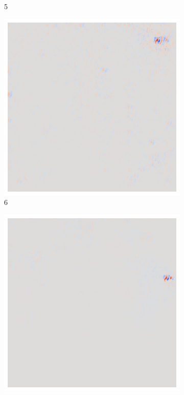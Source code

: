 \begin{figure}[ht!]
\begin{subfigure}{0.095\linewidth}
        \caption{5}
    \end{subfigure}\hfill%
    \begin{subfigure}{0.095\linewidth}
        \centering
        \includegraphics[height=1\linewidth]{01-images/05-resultate/uap_resnet/uap0-resnet18-covid-n200-robustificationslevel6.png}
        \caption{6}
    \end{subfigure}\hfill%
    \begin{subfigure}{0.095\linewidth}
        \centering
        \includegraphics[height=1\linewidth]{01-images/05-resultate/uap_resnet/uap0-resnet18-covid-n200-robustificationslevel7.png}

\end{subfigure}
\end{figure}

